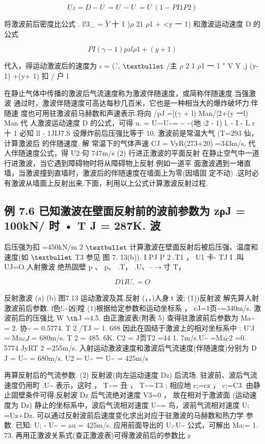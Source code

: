 \[U z = D - U~ = U~ - U~ = U~ (1 - PI 1 P2 )\]

将激波前后密度比公式 . l!3\_ = $\tilde{Y}$ 十 1 )$\rho$ 21 $\rho$1 + <y 一 1) 和激波运动速度 D 的公式

\[PI (\gamma  - 1) p zl \rho 1 + (y+ 1)\]

代入，得运动激波后的速度为 $\iota$ = (.', ${\rm •}$ /主 $\rho$ 2 1 $\rho$1 一 1 " V Y .j (y- 1) +(y+ 1) 扣 / 户 l

在静止气体中传播的激波后气流速度称为激波伴随速度，或简称伴随速度.当强激波 通过时，激波伴随速度可高达每秒几百米，它也是一种相当大的爆炸破坏力.伴随速 度也可用驻激波前马赫数和声速表示.将向 /pJ =[($\gamma$ + l) Man/[2+(y 一l) Man 代 人激波运动速度 D 的公式，可得 u. = U\textasciitilde{}-U\textasciitilde{}= \textasciitilde{} \textasciitilde{}(地 :2 - 1) l. - I - L r 十 1 必知 ll - 1JIJ7.S 设爆炸前后压强比等于 10. 激波前是常温大气 (T=293 仙，计算激波后 的伴随速度. 解 常温下的气体声速 CJ = VyR(273+20) =343m/s. 代人伴随速度公式，得 U2 句 747m/s (2) 行进正激波的平面反射 在静止空气中一道行进激波，当它遇到障碍物时将从障碍物上反射.例如一道平 面激波遇到一堵直墙，当激波撞到直墙时，激波后的伴随速度在墙面上为零(因墙固 定不动) .这时必有激波从墙面上反射出来.下面，利用以上公式计算激波反射过程.

\subsection*{例 7.6  已知激波在壁面反射前的波前参数为 zρJ = 100kN/ 时 • T J = 287K. 波}

后压强为扣 =450kN/m 2 ${\rm •}$ 计算激波在壁面反射后被后压强、温度和速度(如 ${\rm •}$ T3 参见 图 7. 13(b)). I PJ P 2 .T1 ， U1 卡- TJ I .叫 UJ=O 人射撒波 绝热固壁 p 、 p、 .T， .U、--$\rightarrow$寸 T，

\[D1 I U,=O\]

反射激波 (a) (b) 图7.13 运动激波及其.反射 (，，)人身.t 波; (1))反射波 解先算人射激波前后参数. f色!.\textasciitilde{}凶|瞠 (1)根据给定参数和运动坐标系 ， cJ=1页\textasciitilde{}=340m/s. 激波前后的压强比 W ${\rm þ}$J =4.5. 由正激波表(附表 5) 查得驻激波前后参数为 Ma\textasciitilde{} = 2. 协\textasciitilde{} = 0.5774. T 2 /TJ = 1. 688 因此在固结于激波上的相对坐标系中 : U'J = Ma$\tilde{cJ}$ = 680m/s. T 2 = 485. 6K. C2 = J页T2 =44 1. 7m/s.U\textasciitilde{} =Ma$\tilde{c}$2 =0. 5774 JyRT 2 =255m/s. 入射运动激波速度和激波后气流速度(伴随速度)分别为 D J = U\textasciitilde{} = 680m/s. U2 = U\textasciitilde{} 一 U\textasciitilde{} = 425m/s

再算反射后的气流参数. (2) 反射波(向左运动速度 Dz) 后流场. 驻波前、波后气流速度仍用町 .U\textasciitilde{} 表示，这时 ， T\textasciitilde{}= 丑 ， T\textasciitilde{}=T3 ; 相应地 c;=cz ， c;=C3. 由静止固壁条件可得:反射波 Dz 后气流绝对速度 V3=0 ， 故在相对于激波面 (运动速度为 Dz) 静止的坐标系中，波后气流相对速度 U\textasciitilde{}= 鸟，波前气流相对速度 U; =Uz+Dz. 可以通过反射波前后速度变化求出对应于驻激波的马赫数和热力学 参数. 已知: U; - U\textasciitilde{} = au = 425m/s. 应用前面导出的 U;-U\textasciitilde{} 公式，可解出 Ma:= 1. 73. 再用正激波关系式(查正激波表)可得激波前后的参数比 z

